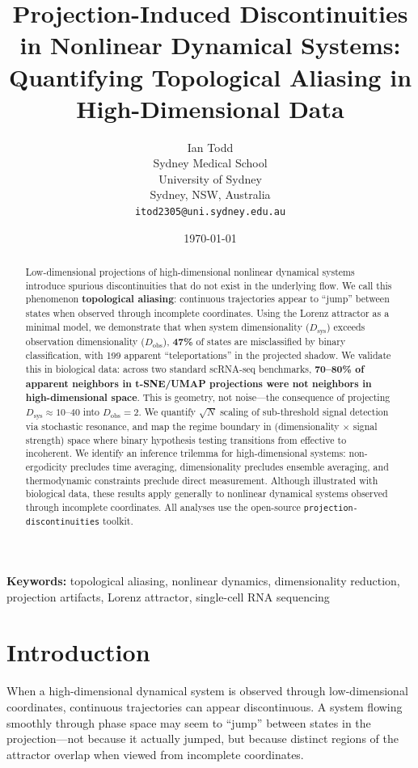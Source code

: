 \documentclass[12pt]{article}
\title{Projection-Induced Discontinuities in Nonlinear Dynamical Systems: Quantifying Topological Aliasing in High-Dimensional Data}
\author{Ian Todd\\
Sydney Medical School\\
University of Sydney\\
Sydney, NSW, Australia\\
\texttt{itod2305@uni.sydney.edu.au}}
\date{\today}
\begin{document}
\maketitle

\begin{abstract}
Low-dimensional projections of high-dimensional nonlinear dynamical systems introduce spurious discontinuities that do not exist in the underlying flow. We call this phenomenon \textbf{topological aliasing}: continuous trajectories appear to ``jump'' between states when observed through incomplete coordinates. Using the Lorenz attractor as a minimal model, we demonstrate that when system dimensionality ($D_{\text{sys}}$) exceeds observation dimensionality ($D_{\text{obs}}$), \textbf{47\%} of states are misclassified by binary classification, with 199 apparent ``teleportations'' in the projected shadow. We validate this in biological data: across two standard scRNA-seq benchmarks, \textbf{70--80\% of apparent neighbors in t-SNE/UMAP projections were not neighbors in high-dimensional space}. This is geometry, not noise---the consequence of projecting $D_{\text{sys}} \approx 10$--40 into $D_{\text{obs}} = 2$. We quantify $\sqrt{N}$ scaling of sub-threshold signal detection via stochastic resonance, and map the regime boundary in (dimensionality $\times$ signal strength) space where binary hypothesis testing transitions from effective to incoherent. We identify an inference trilemma for high-dimensional systems: non-ergodicity precludes time averaging, dimensionality precludes ensemble averaging, and thermodynamic constraints preclude direct measurement. Although illustrated with biological data, these results apply generally to nonlinear dynamical systems observed through incomplete coordinates. All analyses use the open-source \texttt{projection-discontinuities} toolkit.
\end{abstract}

\textbf{Keywords:} topological aliasing, nonlinear dynamics, dimensionality reduction, projection artifacts, Lorenz attractor, single-cell RNA sequencing

\section{Introduction}

When a high-dimensional dynamical system is observed through low-dimensional coordinates, continuous trajectories can appear discontinuous. A system flowing smoothly through phase space may seem to ``jump'' between states in the projection---not because it actually jumped, but because distinct regions of the attractor overlap when viewed from incomplete coordinates.
\end{document}
